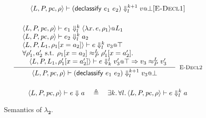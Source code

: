 \documentclass{article}
\makeatletter
\theoremstyle{definition}
\newcommand{\at}{\ensuremath{{\scriptstyle{@}}}}
\newcommand{\pc}{\ensuremath{{\mathit{pc}}}}
\makeatother
\begin{document}
\begin{figure}[ht]
\begin{gather*}
{    }{
      \langle{L, P, \pc, \rho\rangle} |-
      (\mathsf{declassify}\ e_1\ e_2)
      \Downarrow^{k+1}_{l}
      v \at \bot
    }[\textsc{E-Decl1}]
    \\[3ex]
    \inference{
      {\begin{array}{l}
          \langle{L, P, \pc, \rho\rangle} |-
          e_1
          \Downarrow^{k}_{l}
          \langle{\lambda{x}.\, e, \rho_1\rangle} \at L_1
          \\
          \langle{L, P, \pc, \rho\rangle} |-
          e_2
          \Downarrow^{k}_{l}
          a_2
          \\
          \langle{L, P, L_1, \rho_1[x = a_2]\rangle} |-
          e
          \Downarrow^{k}_{l}
          v_3 \at \top
          \\
          \forall{\rho_1', a_2' \text{ s.t. }
            \rho_1[x = a_2] \approx^{L}_{P} \rho_1'[x = a_2']}.
          \\\quad
          \langle{L, P, L_1, \rho_1'[x = a_2']\rangle} |-
          e
          \Downarrow^{l}_{k}
          v_3' \at \top =>
          v_3 \approx^{L}_{P} v_3'
        \end{array}}
    }{
      \langle{L, P, \pc, \rho\rangle} |-
      (\mathsf{declassify}\ e_1\ e_2)
      \Downarrow^{k+1}_{l}
      v_3 \at \bot
    }[\textsc{E-Decl2}]
    \\[3ex]
    \langle{L, P, \pc, \rho\rangle} |-
    e
    \Downarrow
    a
    \quad \triangleq \quad
    \exists{k}.\, \forall{l}.\,
    \langle{L, P, \pc, \rho\rangle} |-
    e
    \Downarrow^{k}_{l}
    a
  \end{gather*}
  \caption{Semantics of $\lambda_{\mathbf{2}}$.}
  \label{fig:semantics}
\end{figure}
\end{document}
